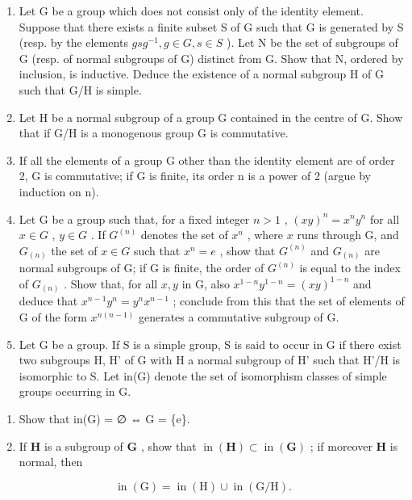 \begin{enumerate}
\def\labelenumi{\arabic{enumi}.}
\setcounter{enumi}{8}
\item
  Let G be a group which does not consist only of the identity element. Suppose that there exists a finite subset S of G such that G is generated by S (resp. by the elements \(gsg^{-1}, g \in G, s \in S\) ). Let N be the set of subgroups of G (resp. of normal subgroups of G) distinct from G. Show that N, ordered by inclusion, is inductive. Deduce the existence of a normal subgroup H of G such that G/H is simple.
\item
  Let H be a normal subgroup of a group G contained in the centre of G. Show that if G/H is a monogenous group G is commutative.
\item
  If all the elements of a group G other than the identity element are of order 2, G is commutative; if G is finite, its order n is a power of 2 (argue by induction on n).
\item
  Let G be a group such that, for a fixed integer \(n > 1\) , \((xy)^n = x^n y^n\) for all \(x \in G\) , \(y \in G\) . If \(G^{(n)}\) denotes the set of \(x^n\) , where \(x\) runs through G, and \(G_{(n)}\) the set of \(x \in G\) such that \(x^n = e\) , show that \(G^{(n)}\) and \(G_{(n)}\) are normal subgroups of G; if G is finite, the order of \(G^{(n)}\) is equal to the index of \(G_{(n)}\) . Show that, for all \(x, y\) in G, also \(x^{1-n}y^{1-n} = (xy)^{1-n}\) and deduce that \(x^{n-1}y^n = y^n x^{n-1}\) ; conclude from this that the set of elements of G of the form \(x^{n(n-1)}\) generates a commutative subgroup of G.
\item
  Let G be a group. If S is a simple group, S is said to occur in G if there exist two subgroups H, H' of G with H a normal subgroup of H' such that H'/H is isomorphic to S. Let in(G) denote the set of isomorphism classes of simple groups occurring in G.
\end{enumerate}

\begin{enumerate}
\def\labelenumi{(\alph{enumi})}
\item
  Show that in(G) = ∅ ⇔ G = \{e\}.
\item
  If \(\mathbf{H}\) is a subgroup of \(\mathbf{G}\) , show that \(\operatorname{in}(\mathbf{H}) \subset \operatorname{in}(\mathbf{G})\) ; if moreover \(\mathbf{H}\) is normal, then
\end{enumerate}

\[
\operatorname{in} (\mathrm{G}) = \operatorname{in} (\mathrm{H}) \cup \operatorname{in} (\mathrm{G} / \mathrm{H}).
\]

